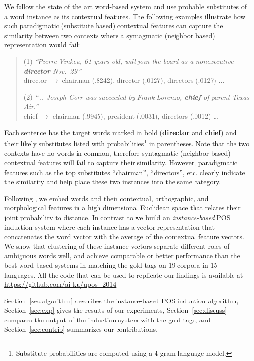 We follow the state of the art word-based system
\cite{yatbaz-sert-yuret:2012:EMNLP-CoNLL} and use probable substitutes
of a word instance as its contextual features.  The following examples
illustrate how such paradigmatic (substitute based) contextual
features can capture the similarity between two contexts where a
syntagmatic (neighbor based) representation would fail:

\begin{quotation}
(1) {\em ``Pierre Vinken, 61 years old, will join the board
  as a nonexecutive {\bf director} Nov.~29.''} 
\\ director $\rightarrow$ chairman
(.8242), director (.0127), directors (.0127) $\ldots$

(2) {\em ``$\ldots$ Joseph Corr was succeeded by Frank
  Lorenzo, {\bf chief} of parent Texas Air.''} 
\\ chief $\rightarrow$ chairman
(.9945), president (.0031), directors (.0012) $\ldots$
\end{quotation}

Each sentence has the target words marked in bold ({\bf director} and
{\bf chief}) and their likely substitutes listed with
probabilities\footnote{Substitute probabilities are computed using a
  4-gram language model.} in parentheses.  Note that the two contexts
have no words in common, therefore syntagmatic (neighbor based)
contextual features will fail to capture their similarity.  However,
paradigmatic features such as the top substitutes ``chairman'',
``directors'', etc.  clearly indicate the similarity and help place
these two instances into the same category.

Following \cite{globerson2007euclidean}, we embed words and their
contextual, orthographic, and morphological features in a high
dimensional Euclidean space that relates their joint probability to
distance.  In contrast to \cite{yatbaz-sert-yuret:2012:EMNLP-CoNLL} we
build an {\em instance-based} POS induction system where each instance
has a vector representation that concatenates the word vector with the
average of the contextual feature vectors.  We show that clustering of
these instance vectors separate different roles of ambiguous words
well, and achieve comparable or better performance than the best
word-based systems in matching the gold tags on 19 corpora in 15
languages.  All the code that can be used to replicate our findings is
available at \url{https://github.com/ai-ku/upos_2014}.

Section~\ref{sec:algorithm} describes the instance-based POS induction
algorithm, Section~\ref{sec:exp} gives the results of our experiments,
Section~\ref{sec:discuss} compares the output of the induction system
with the gold tags, and Section~\ref{sec:contrib} summarizes our
contributions.
